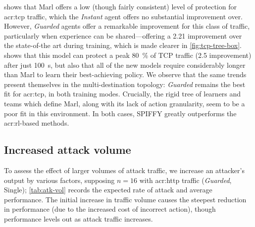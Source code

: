 %	

 shows that Marl offers a low (though fairly consistent) level of protection for \gls{acr:tcp} traffic, which the \emph{Instant} agent offers no substantial improvement over.
However, \emph{Guarded} agents offer a remarkable improvement for this class of traffic, particularly when experience can be shared---offering a \qty{2.21}{\times} improvement over the state-of-the art during training, which is made clearer in \cref{fig:tcp-tree-box}.
 shows that this model can protect a peak \qty{80}{\percent} of TCP traffic (\qty{2.5}{\times} improvement) after just \qty{100}{\second}, but also that all of the new models require considerably longer than Marl to learn their best-achieving policy.
We observe that the same trends present themselves in the multi-destination topology: \emph{Guarded} remains the best fit for \gls{acr:tcp}, in both training modes.
Crucially, the rigid tree of learners and teams which define Marl, along with its lack of action granularity, seem to be a poor fit in this environment.
In both cases, SPIFFY greatly outperforms the \gls{acr:rl}-based methods.


\subsection{Increased attack volume}\label{sec:results-attack-volume}
To assess the effect of larger volumes of attack traffic, we increase an attacker's output by various factors, supposing $n=16$ with \gls{acr:http} traffic (\emph{Guarded}, Single); \cref{tab:atk-vol} records the expected rate of attack and average performance.
The initial increase in traffic volume causes the steepest reduction in performance (due to the increased cost of incorrect action), though performance levels out as attack traffic increases.

